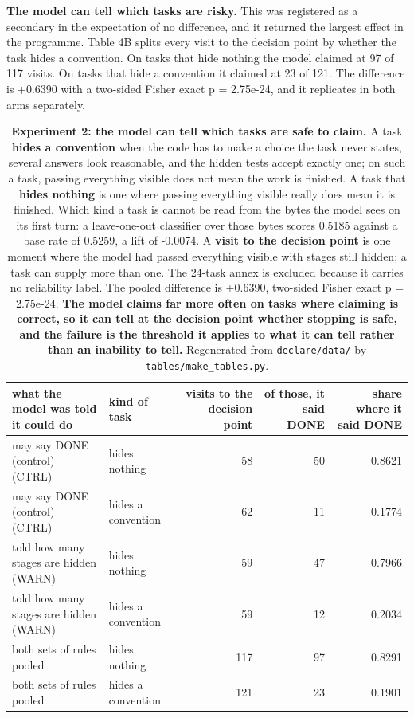 \documentclass[11pt]{article}
\begin{document}
\textbf{The model can tell which tasks are risky.} This was registered as a secondary in the expectation of no difference, and it returned the largest effect in the programme. Table 4B splits every visit to the decision point by whether the task hides a convention. On tasks that hide nothing the model claimed at 97 of 117 visits. On tasks that hide a convention it claimed at 23 of 121. The difference is +0.6390 with a two-sided Fisher exact p = 2.75e-24, and it replicates in both arms separately.

\begin{table}[t]
\centering
\small
\setlength{\tabcolsep}{3.4pt}
\begin{tabularx}{\textwidth}{L{2.206}L{1.324}R{0.588}R{0.441}R{0.441}}
\toprule
\textbf{what the model was told it could do} & \textbf{kind of task} & \textbf{visits to the decision point} & \textbf{of those, it said DONE} & \textbf{share where it said DONE} \\
\midrule
may say DONE (control) (CTRL) & hides nothing & 58 & 50 & 0.8621 \\
may say DONE (control) (CTRL) & hides a convention & 62 & 11 & 0.1774 \\
told how many stages are hidden (WARN) & hides nothing & 59 & 47 & 0.7966 \\
told how many stages are hidden (WARN) & hides a convention & 59 & 12 & 0.2034 \\
both sets of rules pooled & hides nothing & 117 & 97 & 0.8291 \\
both sets of rules pooled & hides a convention & 121 & 23 & 0.1901 \\
\bottomrule
\end{tabularx}
\caption{\textbf{Experiment 2: the model can tell which tasks are safe to claim.} A task \textbf{hides a convention} when the code has to make a choice the task never states, several answers look reasonable, and the hidden tests accept exactly one; on such a task, passing everything visible does not mean the work is finished. A task that \textbf{hides nothing} is one where passing everything visible really does mean it is finished. Which kind a task is cannot be read from the bytes the model sees on its first turn: a leave-one-out classifier over those bytes scores 0.5185 against a base rate of 0.5259, a lift of -0.0074. A \textbf{visit to the decision point} is one moment where the model had passed everything visible with stages still hidden; a task can supply more than one. The 24-task annex is excluded because it carries no reliability label. The pooled difference is +0.6390, two-sided Fisher exact p = 2.75e-24. \textbf{The model claims far more often on tasks where claiming is correct, so it can tell at the decision point whether stopping is safe, and the failure is the threshold it applies to what it can tell rather than an inability to tell.} Regenerated from \texttt{declare/data/} by \texttt{tables/make\_tables.py}.}
\label{tab:T4B}
\end{table}
\end{document}
